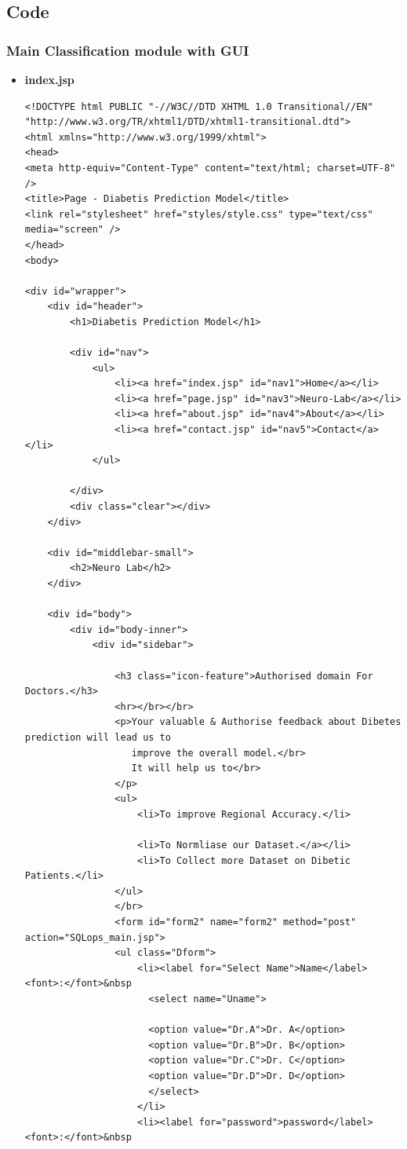 \documentclass[a4paper,14pt,onecolumn]{article}
\begin{document}
\subsection{Code}
\subsubsection{Main Classification module with GUI}
\begin{itemize}
\item \textbf{index.jsp}
\begin{verbatim}
<!DOCTYPE html PUBLIC "-//W3C//DTD XHTML 1.0 Transitional//EN" "http://www.w3.org/TR/xhtml1/DTD/xhtml1-transitional.dtd">
<html xmlns="http://www.w3.org/1999/xhtml">
<head>
<meta http-equiv="Content-Type" content="text/html; charset=UTF-8" />
<title>Page - Diabetis Prediction Model</title>
<link rel="stylesheet" href="styles/style.css" type="text/css" media="screen" />
</head>
<body>

<div id="wrapper">
	<div id="header">
		<h1>Diabetis Prediction Model</h1>

		<div id="nav">
			<ul>
				<li><a href="index.jsp" id="nav1">Home</a></li>
				<li><a href="page.jsp" id="nav3">Neuro-Lab</a></li>
				<li><a href="about.jsp" id="nav4">About</a></li>
				<li><a href="contact.jsp" id="nav5">Contact</a></li>
			</ul>

		</div>
		<div class="clear"></div>
	</div>
	
	<div id="middlebar-small">
		<h2>Neuro Lab</h2>
	</div>
	
	<div id="body">	
		<div id="body-inner">			
			<div id="sidebar">

			    <h3 class="icon-feature">Authorised domain For Doctors.</h3>
				<hr></br></br>
				<p>Your valuable & Authorise feedback about Dibetes prediction will lead us to
                   improve the overall model.</br>
				   It will help us to</br>
                </p>   	
	            <ul>
					<li>To improve Regional Accuracy.</li>

					<li>To Normliase our Dataset.</a></li>
					<li>To Collect more Dataset on Dibetic Patients.</li>
				</ul>	
                </br>				
                <form id="form2" name="form2" method="post" action="SQLops_main.jsp">
				<ul class="Dform">
					<li><label for="Select Name">Name</label><font>:</font>&nbsp 
					  <select name="Uname">

                      <option value="Dr.A">Dr. A</option>
                      <option value="Dr.B">Dr. B</option>
                      <option value="Dr.C">Dr. C</option>
                      <option value="Dr.D">Dr. D</option>
                      </select> 
					</li>
					<li><label for="password">password</label><font>:</font>&nbsp


\end{verbatim}
\end{itemize}
\end{document}
